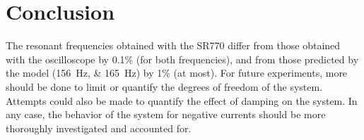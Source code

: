 \documentclass{article}
\begin{document}
\section{Conclusion}
The resonant frequencies obtained with the SR770 differ from those obtained with the oscilloscope by 0.1\% (for both frequencies), and from those predicted by the model (\qtylist{156;165}{Hz}) by 1\% (at most).
For future experiments, more should be done to limit or quantify the degrees of freedom of the system. Attempts could also be made to quantify the effect of damping on the system. In any case, the behavior of the system for negative currents should be more thoroughly investigated and accounted for.
\end{document}
